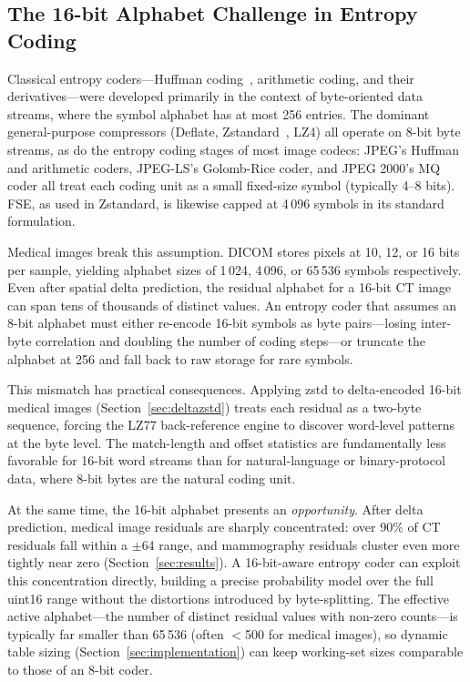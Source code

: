 \documentclass[11pt,twocolumn]{article}
\begin{document}
\subsection{The 16-bit Alphabet Challenge in Entropy Coding}
\label{sec:related_16bit}

Classical entropy coders---Huffman coding~\cite{schwartz1964}, arithmetic coding, and their derivatives---were developed primarily in the context of byte-oriented data streams, where the symbol alphabet has at most 256 entries.
The dominant general-purpose compressors (Deflate, Zstandard~\cite{zstd}, LZ4) all operate on 8-bit byte streams, as do the entropy coding stages of most image codecs: JPEG's Huffman and arithmetic coders, JPEG-LS's Golomb-Rice coder, and JPEG 2000's MQ coder all treat each coding unit as a small fixed-size symbol (typically 4--8 bits).
FSE, as used in Zstandard, is likewise capped at 4\,096 symbols in its standard formulation.

Medical images break this assumption.
DICOM stores pixels at 10, 12, or 16 bits per sample, yielding alphabet sizes of 1\,024, 4\,096, or 65\,536 symbols respectively.
Even after spatial delta prediction, the residual alphabet for a 16-bit CT image can span tens of thousands of distinct values.
An entropy coder that assumes an 8-bit alphabet must either re-encode 16-bit symbols as byte pairs---losing inter-byte correlation and doubling the number of coding steps---or truncate the alphabet at 256 and fall back to raw storage for rare symbols.

This mismatch has practical consequences.
Applying zstd to delta-encoded 16-bit medical images (Section~\ref{sec:deltazstd}) treats each residual as a two-byte sequence, forcing the LZ77 back-reference engine to discover word-level patterns at the byte level.
The match-length and offset statistics are fundamentally less favorable for 16-bit word streams than for natural-language or binary-protocol data, where 8-bit bytes are the natural coding unit.

At the same time, the 16-bit alphabet presents an \emph{opportunity}.
After delta prediction, medical image residuals are sharply concentrated: over 90\% of CT residuals fall within a $\pm$64 range, and mammography residuals cluster even more tightly near zero (Section~\ref{sec:results}).
A 16-bit-aware entropy coder can exploit this concentration directly, building a precise probability model over the full uint16 range without the distortions introduced by byte-splitting.
The effective active alphabet---the number of distinct residual values with non-zero counts---is typically far smaller than 65\,536 (often $<$500 for medical images), so dynamic table sizing (Section~\ref{sec:implementation}) can keep working-set sizes comparable to those of an 8-bit coder.
\end{document}
